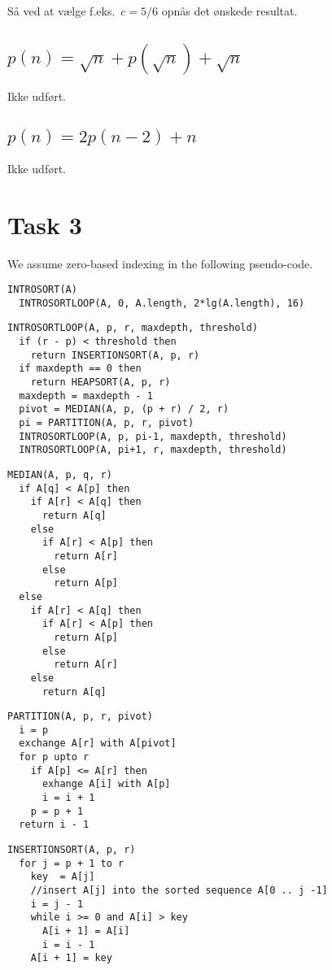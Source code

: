 \documentclass[paper=a4, fleqn]{article}
\begin{document}
Så ved at vælge f.eks.\ $c=5/6$ opnås det ønskede resultat.

\subsection*{$p(n)=\sqrt{n}+p(\sqrt{n})+\sqrt{n}$}

Ikke udført.

\subsection*{$p(n)=2p(n-2)+n$}

Ikke udført.

\section*{Task 3}

We assume zero-based indexing in the following pseudo-code.

\begin{lstlisting}
INTROSORT(A)
  INTROSORTLOOP(A, 0, A.length, 2*lg(A.length), 16)
\end{lstlisting}

\begin{lstlisting}
INTROSORTLOOP(A, p, r, maxdepth, threshold)
  if (r - p) < threshold then
    return INSERTIONSORT(A, p, r)
  if maxdepth == 0 then
    return HEAPSORT(A, p, r)
  maxdepth = maxdepth - 1
  pivot = MEDIAN(A, p, (p + r) / 2, r)
  pi = PARTITION(A, p, r, pivot)
  INTROSORTLOOP(A, p, pi-1, maxdepth, threshold)
  INTROSORTLOOP(A, pi+1, r, maxdepth, threshold)
\end{lstlisting}

\begin{lstlisting}
MEDIAN(A, p, q, r)
  if A[q] < A[p] then
    if A[r] < A[q] then
      return A[q]
    else
      if A[r] < A[p] then
        return A[r]
      else 
        return A[p]
  else
    if A[r] < A[q] then
      if A[r] < A[p] then
        return A[p]
      else
        return A[r]
    else
      return A[q]
\end{lstlisting}

\begin{lstlisting}
PARTITION(A, p, r, pivot)
  i = p
  exchange A[r] with A[pivot]
  for p upto r
    if A[p] <= A[r] then
      exhange A[i] with A[p]
      i = i + 1
    p = p + 1
  return i - 1
\end{lstlisting}

\begin{lstlisting}
INSERTIONSORT(A, p, r)
  for j = p + 1 to r
    key  = A[j]
    //insert A[j] into the sorted sequence A[0 .. j -1]
    i = j - 1
    while i >= 0 and A[i] > key
      A[i + 1] = A[i]
      i = i - 1
    A[i + 1] = key
\end{lstlisting}
\end{document}
